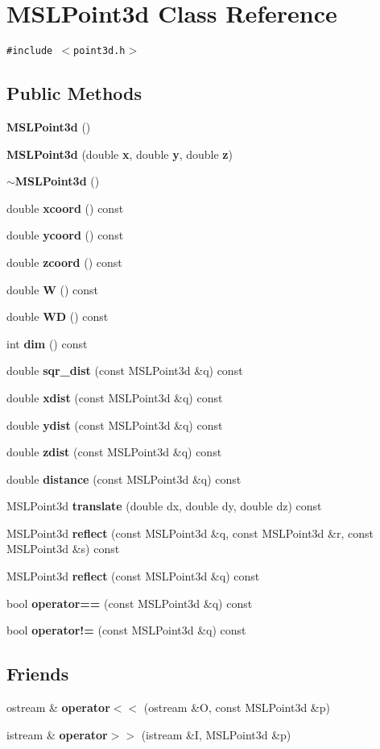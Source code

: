 \section{MSLPoint3d  Class Reference}
\label{classMSLPoint3d}
{\tt \#include $<$point3d.h$>$}

\subsection*{Public Methods}
\begin{CompactItemize}
\item 
{\bf MSLPoint3d} ()
\item 
{\bf MSLPoint3d} (double {\bf x}, double {\bf y}, double {\bf z})
\item 
{\bf $\sim$MSLPoint3d} ()
\item 
double {\bf xcoord} () const
\item 
double {\bf ycoord} () const
\item 
double {\bf zcoord} () const
\item 
double {\bf W} () const
\item 
double {\bf WD} () const
\item 
int {\bf dim} () const
\item 
double {\bf sqr\_\-dist} (const MSLPoint3d \&q) const
\item 
double {\bf xdist} (const MSLPoint3d \&q) const
\item 
double {\bf ydist} (const MSLPoint3d \&q) const
\item 
double {\bf zdist} (const MSLPoint3d \&q) const
\item 
double {\bf distance} (const MSLPoint3d \&q) const
\item 
MSLPoint3d {\bf translate} (double dx, double dy, double dz) const
\item 
MSLPoint3d {\bf reflect} (const MSLPoint3d \&q, const MSLPoint3d \&r, const MSLPoint3d \&s) const
\item 
MSLPoint3d {\bf reflect} (const MSLPoint3d \&q) const
\item 
bool {\bf operator==} (const MSLPoint3d \&q) const
\item 
bool {\bf operator!=} (const MSLPoint3d \&q) const
\end{CompactItemize}
\subsection*{Friends}
\begin{CompactItemize}
\item 
ostream \& {\bf operator$<$$<$} (ostream \&O, const MSLPoint3d \&p)
\item 
istream \& {\bf operator$>$$>$} (istream \&I, MSLPoint3d \&p)
\end{CompactItemize}


